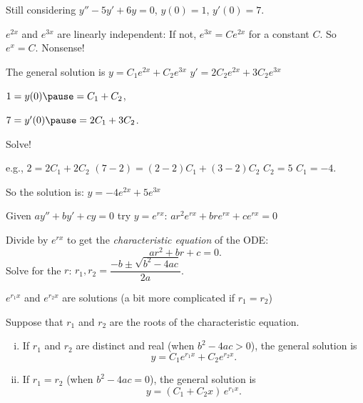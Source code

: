 \documentclass[10pt,aspectratio=169]{beamer}
\begin{document}
\begin{frame}
Still considering
\qquad $y''-5y'+6y = 0$, \qquad $y(0) = 1$, \qquad $y'(0) = 7$.

\medskip

$e^{2x}$ and $e^{3x}$ are linearly independent:
\pause
If not, $e^{3x} = C e^{2x}$ for a constant $C$.
\pause
So $e^x = C$.
\pause
Nonsense!

\medskip
\pause

The general solution is \quad $y = C_1 e^{2x} + C_2 e^{3x}$
\pause
\qquad
$y' = 2 C_2 e^{2x} + 3 C_2 e^{3x}$

\medskip
\pause

$1 = y(0) \pause = C_1 + C_2$,

\medskip
\pause

$7 = y'(0) \pause = 2 C_1 + 3 C_2$.

\medskip
\pause

Solve!

\pause
e.g., $2 = 2C_1 + 2C_2$
\pause\wthus
$(7-2) = (2-2)C_1 + (3-2)C_2$
\pause
\wthus
$C_2 = 5$
\wthus
\pause
$C_1 = -4$.

\medskip
\pause

So the solution is: \quad
$y = -4 e^{2x} + 5 e^{3x}$

\end{frame}

\begin{frame}
Given
\quad
$a y'' + b y' + c y = 0$
\qquad
\pause
try $y = e^{rx}$:
\quad
$a r^2 e^{rx} + 
b r e^{rx} + 
c e^{rx} = 0$

\medskip
\pause
Divide by $e^{rx}$ to get the
\emph{characteristic equation} of the ODE:
\[
a r^2 + 
b r + 
c = 0 .
\]
\pause
Solve for the $r$:
\qquad 
$r_1, r_2 = \dfrac{-b \pm \sqrt{b^2 - 4ac}}{2a}$.

\medskip
\pause

\wthus $e^{r_1 x}$ and $e^{r_2 x}$ are solutions (a bit more complicated if
$r_1=r_2$)

\pause
\begin{theorem}
Suppose that $r_1$ and $r_2$ are the roots of the characteristic equation.
\begin{enumerate}[(i)]
\item\pause
If $r_1$ and $r_2$ are distinct and real (when $b^2 - 4ac > 0$),
the general solution is
\[
y = C_1 e^{r_1 x} + C_2 e^{r_2 x} .
\]
\item
\pause
If $r_1 = r_2$ (when $b^2 - 4ac = 0$), 
the general solution is
\[
y = (C_1 + C_2 x)\, e^{r_1 x} .
\]
\end{enumerate}
\end{theorem}
\end{frame}
\end{document}
